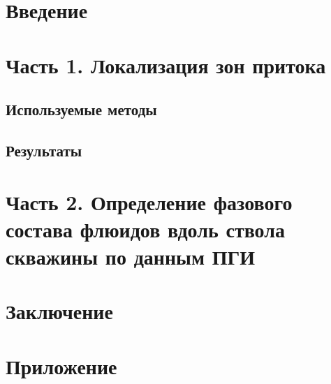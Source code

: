 \documentclass[a4paper,12pt]{article}
\begin{document}
\tableofcontents
\newpage

\section{Введение}

\newpage

\section{Часть 1. Локализация зон притока}

\subsection{Используемые методы}




\subsection{Результаты}



\newpage

\section{Часть 2. Определение фазового состава флюидов вдоль ствола скважины по данным ПГИ}




\newpage

\section{Заключение}

\newpage


\newpage

\section{Приложение}

\end{document}

